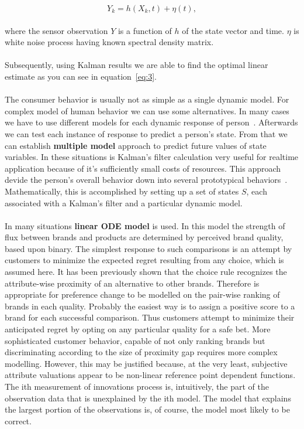 \begin{equation} \label{eq:2}
Y_k = h(X_k, t) + \eta(t),
\end{equation}
\\
where the sensor observation $Y$ is a function of $h$ of the state vector and time. $\eta$ is white noise process having known spectral density matrix.\\
\\
Subsequently, using Kalman results we are able to find the optimal linear estimate as you can see in equation~\ref{eq:3}.\\
\\
The consumer behavior is usually not as simple as a single dynamic model.
For complex model of human behavior we can use some alternatives.
In many cases we have to use different models for each dynamic response of person~\cite{wilsky}.
Afterwards we can test each instance of response to predict a person's state.
From that we can establish \textbf{multiple model} approach to predict future values of state variables.
In these situations is Kalman’s filter calculation very useful for realtime application because of it’s sufficiently small costs of resources.
This approach devide the person’s overall behavior down into several prototypical behaviors~\cite{pantland}.
Mathematically, this is accomplished by setting up a set of states $S$, each associated with a Kalman’s filter and a particular dynamic model.\\
\\
In many situations \textbf{linear ODE model} is used.
In this model the strength of flux between brands and products are determined by perceived brand quality, based upon binary.
The simplest response to such comparisons is an attempt by customers to minimize the expected regret resulting from any choice, which is assumed here.
It has been previously shown that the choice rule recognizes the attribute-wise proximity of an alternative to other brands.
Therefore is appropriate for preference change to be modelled on the pair-wise ranking of brands in each quality.
Probably the easiest way is to assign a positive score to a brand for each successful comparison.
Thus customers attempt to minimize their anticipated regret by opting on any particular quality for a safe bet.
More sophisticated customer behavior, capable of not only ranking brands but discriminating according to the size of proximity gap requires more complex modelling.
However, this may be justified because, at the very least, subjective attribute valuations appear to be non-linear reference point dependent functions.
The ith measurement of innovations process is, intuitively, the part of the observation data that is unexplained by the ith model.
The model that explains the largest portion of the observations is, of course, the model most likely to be correct.
\\
